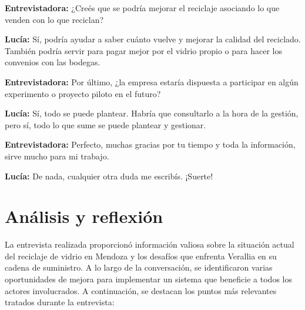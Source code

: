 \textbf{Entrevistadora:} ¿Creés que se podría mejorar el reciclaje asociando lo que venden con lo que reciclan?

\textbf{Lucía:} Sí, podría ayudar a saber cuánto vuelve y mejorar la calidad del reciclado. También podría servir para pagar mejor por el vidrio propio o para hacer los convenios con las bodegas.

\textbf{Entrevistadora:} Por último, ¿la empresa estaría dispuesta a participar en algún experimento o proyecto piloto en el futuro?

\textbf{Lucía:} Sí, todo se puede plantear. Habría que consultarlo a la hora de la gestión, pero sí, todo lo que sume se puede plantear y gestionar.

\textbf{Entrevistadora:} Perfecto, muchas gracias por tu tiempo y toda la información, sirve mucho para mi trabajo.

\textbf{Lucía:} De nada, cualquier otra duda me escribís. ¡Suerte!

\section{Análisis y reflexión}

La entrevista realizada proporcionó información valiosa sobre la situación actual del reciclaje de vidrio en Mendoza y los desafíos que enfrenta Verallia en su cadena de suministro. A lo largo de la conversación, se identificaron varias oportunidades de mejora para implementar un sistema que beneficie a todos los actores involucrados. A continuación, se destacan los puntos más relevantes tratados durante la entrevista:

